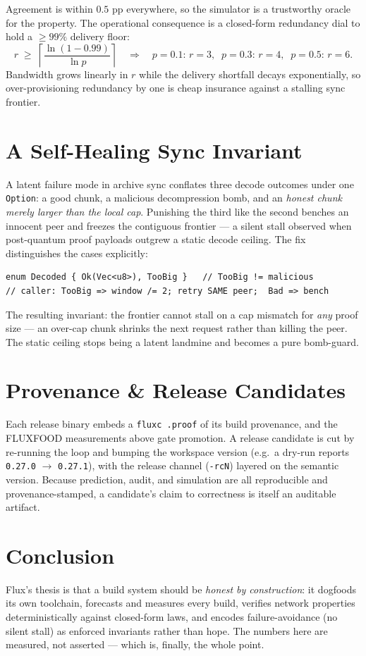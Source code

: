 \documentclass[11pt]{article}
\begin{document}
Agreement is within $0.5$ pp everywhere, so the simulator is a trustworthy oracle for
the property. The operational consequence is a closed-form redundancy dial to hold a
$\geq 99\%$ delivery floor:
\[
r \;\geq\; \left\lceil \frac{\ln(1-0.99)}{\ln p} \right\rceil
\quad\Rightarrow\quad
p{=}0.1{:}\,r{=}3,\;\; p{=}0.3{:}\,r{=}4,\;\; p{=}0.5{:}\,r{=}6.
\]
Bandwidth grows linearly in $r$ while the delivery shortfall decays exponentially, so
over-provisioning redundancy by one is cheap insurance against a stalling sync frontier.

\section{A Self-Healing Sync Invariant}
A latent failure mode in archive sync conflates three decode outcomes under one
\texttt{Option}: a good chunk, a malicious decompression bomb, and an \emph{honest chunk
merely larger than the local cap}. Punishing the third like the second benches an
innocent peer and freezes the contiguous frontier --- a silent stall observed when
post-quantum proof payloads outgrew a static decode ceiling. The fix distinguishes the
cases explicitly:
\begin{lstlisting}
enum Decoded { Ok(Vec<u8>), TooBig }   // TooBig != malicious
// caller: TooBig => window /= 2; retry SAME peer;  Bad => bench
\end{lstlisting}
The resulting invariant: the frontier cannot stall on a cap mismatch for \emph{any}
proof size --- an over-cap chunk shrinks the next request rather than killing the peer.
The static ceiling stops being a latent landmine and becomes a pure bomb-guard.

\section{Provenance \& Release Candidates}
Each release binary embeds a \texttt{fluxc .proof} of its build provenance, and the
FLUXFOOD measurements above gate promotion. A release candidate is cut by re-running the
loop and bumping the workspace version (e.g.\ a dry-run reports \texttt{0.27.0}
$\rightarrow$ \texttt{0.27.1}), with the release channel (\texttt{-rcN}) layered on the
semantic version. Because prediction, audit, and simulation are all reproducible and
provenance-stamped, a candidate's claim to correctness is itself an auditable artifact.

\section{Conclusion}
Flux's thesis is that a build system should be \emph{honest by construction}: it
dogfoods its own toolchain, forecasts and measures every build, verifies network
properties deterministically against closed-form laws, and encodes failure-avoidance
(no silent stall) as enforced invariants rather than hope. The numbers here are
measured, not asserted --- which is, finally, the whole point.
\end{document}
